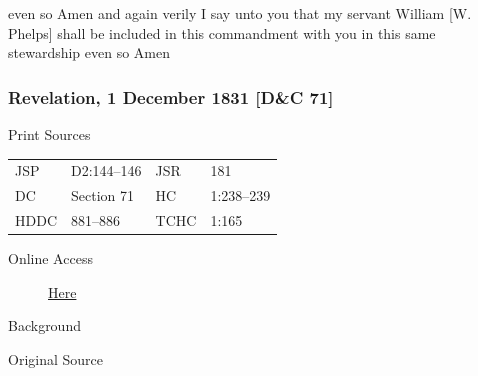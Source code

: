 {				even so Amen and again verily I say unto you that my servant William [W. Phelps] shall be included in this commandment with you in this same stewardship even so Amen
				
		\subsubsection{Revelation, 1 December 1831 [D\&C 71]}
			\label{EMS-1831-JS-1-DEC-1831}
		
			\begin{description}
				\item[Print Sources]
			\end{description}

				\begin{tabular}{p{0.5in}p{1in}p{0.5in}p{1in}}
				JSP	 	& D2:144--146	& JSR 		& 181 \\
				DC	 	& Section 71 	& HC 		& 1:238--239 \\
				HDDC 	& 881--886		& TCHC 		& 1:165 \\
				\end{tabular}
			
			\begin{description}
				\item[Online Access] \href{https://www.josephsmithpapers.org/paper-summary/revelation-1-december-1831-dc-71/1}{Here}
			\end{description}
			
			\begin{description}
				\item[Background]
			\end{description}
			
			
			\begin{description}
				\item[Original Source]
			\end{description}
			
			
}
